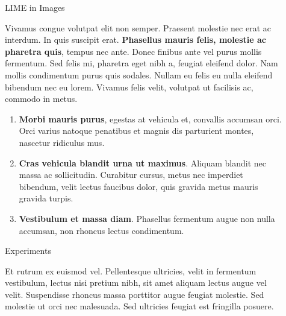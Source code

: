 \documentclass[final]{beamer}
\newlength{\sepwidth}
\newlength{\colwidth}
\newcommand{\separatorcolumn}{\begin{column}{\sepwidth}\end{column}}
\begin{document}
\begin{frame}[t]
\begin{columns}[t]
\begin{column}{\colwidth}
\end{column}

\separatorcolumn

\begin{column}{\colwidth}

  \begin{block}{LIME in Images}

    Vivamus congue volutpat elit non semper. Praesent molestie nec erat ac
    interdum. In quis suscipit erat. \textbf{Phasellus mauris felis, molestie
    ac pharetra quis}, tempus nec ante. Donec finibus ante vel purus mollis
    fermentum. Sed felis mi, pharetra eget nibh a, feugiat eleifend dolor. Nam
    mollis condimentum purus quis sodales. Nullam eu felis eu nulla eleifend
    bibendum nec eu lorem. Vivamus felis velit, volutpat ut facilisis ac,
    commodo in metus.

    \begin{enumerate}
      \item \textbf{Morbi mauris purus}, egestas at vehicula et, convallis
        accumsan orci. Orci varius natoque penatibus et magnis dis parturient
        montes, nascetur ridiculus mus.
      \item \textbf{Cras vehicula blandit urna ut maximus}. Aliquam blandit nec
        massa ac sollicitudin. Curabitur cursus, metus nec imperdiet bibendum,
        velit lectus faucibus dolor, quis gravida metus mauris gravida turpis.
      \item \textbf{Vestibulum et massa diam}. Phasellus fermentum augue non
        nulla accumsan, non rhoncus lectus condimentum.
    \end{enumerate}

  \end{block}

  \begin{block}{Experiments}

    Et rutrum ex euismod vel. Pellentesque ultricies, velit in fermentum
    vestibulum, lectus nisi pretium nibh, sit amet aliquam lectus augue vel
    velit. Suspendisse rhoncus massa porttitor augue feugiat molestie. Sed
    molestie ut orci nec malesuada. Sed ultricies feugiat est fringilla
    posuere.

\vspace{1em}


\end{block}
\end{column}
\end{columns}
\end{frame}
\end{document}
